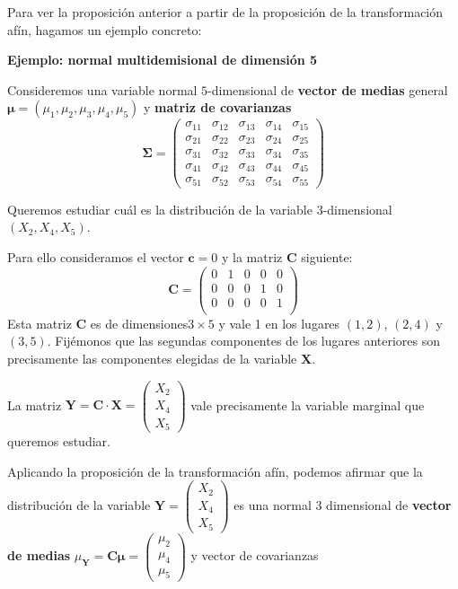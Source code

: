 \documentclass[]{book}
\begin{document}
Para ver la proposición anterior a partir de la proposición de la transformación afín, hagamos un ejemplo concreto:

\textbf{Ejemplo: normal multidemisional de dimensión 5}

Consideremos una variable normal \(5\)-dimensional de \textbf{vector de medias} general \(\mathbf{\mu}=(\mu_1,\mu_2,\mu_3,\mu_4,\mu_5)\) y \textbf{matriz de covarianzas}
\[
\mathbf{\Sigma}=\begin{pmatrix}
\sigma_{11} & \sigma_{12} & \sigma_{13} & \sigma_{14} & \sigma_{15} \\
\sigma_{21} & \sigma_{22} & \sigma_{23} & \sigma_{24} & \sigma_{25} \\
\sigma_{31} & \sigma_{32} & \sigma_{33} & \sigma_{34} & \sigma_{35} \\
\sigma_{41} & \sigma_{42} & \sigma_{43} & \sigma_{44} & \sigma_{45} \\
\sigma_{51} & \sigma_{52} & \sigma_{53} & \sigma_{54} & \sigma_{55} 
\end{pmatrix}
\]

Queremos estudiar cuál es la distribución de la variable \(3\)-dimensional \((X_2,X_4,X_5)\).

Para ello consideramos el vector \(\mathbf{c}=0\) y la matriz \(\mathbf{C}\) siguiente:
\[
\mathbf{C}=\begin{pmatrix}
0 & 1 & 0 & 0 & 0 \\
0 & 0 & 0 & 1 & 0 \\
0 & 0 & 0 & 0 & 1 \\
\end{pmatrix}
\]
Esta matriz \(\mathbf{C}\) es de dimensiones\(3\times 5\) y vale 1 en los lugares \((1,2)\), \((2,4)\) y \((3,5)\). Fijémonos que las segundas componentes de los lugares anteriores son precisamente las componentes elegidas de la variable \(\mathbf{X}\).

La matriz \(\mathbf{Y}=\mathbf{C}\cdot \mathbf{X}=\begin{pmatrix}X_2\\X_4\\X_5\end{pmatrix}\) vale precisamente la variable marginal que queremos estudiar.

Aplicando la proposición de la transformación afín, podemos afirmar que la distribución de la variable \(\mathbf{Y}=\begin{pmatrix}X_2\\X_4\\X_5\end{pmatrix}\) es una normal \(3\) dimensional de \textbf{vector de medias} \(\mu_{\mathbf{Y}}=\mathbf{C}\mathbf{\mu}=\begin{pmatrix}\mu_2\\\mu_4\\\mu_5\end{pmatrix}\) y vector de covarianzas
\end{document}
